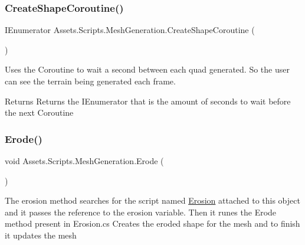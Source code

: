 \mbox{\label{class_assets_1_1_scripts_1_1_mesh_generation_a533ee7b8be835fa3b6f6282e86fd9ec6}} 
\subsubsection{\texorpdfstring{CreateShapeCoroutine()}{CreateShapeCoroutine()}}
{\footnotesize\ttfamily I\+Enumerator Assets.\+Scripts.\+Mesh\+Generation.\+Create\+Shape\+Coroutine (\begin{DoxyParamCaption}{ }\end{DoxyParamCaption})}



Uses the Coroutine to wait a second between each quad generated. So the user can see the terrain being generated each frame. 

\begin{DoxyReturn}{Returns}
Returns the I\+Enumerator that is the amount of seconds to wait before the next Coroutine
\end{DoxyReturn}
\mbox{\label{class_assets_1_1_scripts_1_1_mesh_generation_a4ca64ff2f5c1b7f9073699905628e6dd}} 
\subsubsection{\texorpdfstring{Erode()}{Erode()}}
{\footnotesize\ttfamily void Assets.\+Scripts.\+Mesh\+Generation.\+Erode (\begin{DoxyParamCaption}{ }\end{DoxyParamCaption})}



The erosion method searches for the script named \mbox{\hyperlink{class_assets_1_1_scripts_1_1_erosion}{Erosion}} attached to this object and it passes the reference to the erosion variable. Then it runes the Erode method present in Erosion.\+cs Creates the eroded shape for the mesh and to finish it updates the mesh 

\mbox{\label{class_assets_1_1_scripts_1_1_mesh_generation_a132027f38358668e6f8c320b00ee9327}} 
